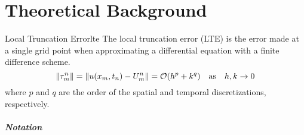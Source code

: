 \chapter{Theoretical Background}

\begin{definition}{Local Truncation Error}{lte}
  The local truncation error (LTE) is the error made at a single grid point when approximating a differential equation with a finite difference scheme.
  \[
    \lVert\tau_m^n\rVert = \lVert u(x_m, t_n) - U_m^n\rVert = \mathcal{O}(h^p + k^q) \quad \text{as} \quad h, k \to 0 
  \]
  where \(p\) and \(q\) are the order of the spatial and temporal discretizations, respectively.
\end{definition}


\paragraph{Notation}
